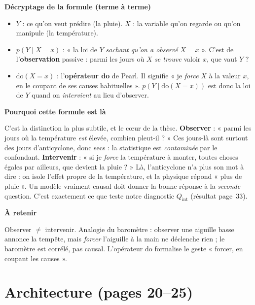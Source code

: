 \documentclass[11pt,a4paper]{article}
\newcommand{\bloc}[1]{\par\medskip\noindent\textcolor{accent}{\textbf{#1}}\par\nopagebreak\smallskip}
\begin{document}
\bloc{Décryptage de la formule (terme à terme)}
\begin{itemize}[nosep]
  \item $Y$ : ce qu'on veut prédire (la pluie). $X$ : la variable qu'on regarde ou qu'on manipule (la température).
  \item $p(Y \mid X=x)$ : « la loi de $Y$ \emph{sachant qu'on a observé} $X=x$ ». C'est de l'\textbf{observation} passive : parmi les jours où $X$ \emph{se trouve} valoir $x$, que vaut $Y$ ?
  \item $\mathrm{do}(X=x)$ : l'\textbf{opérateur do} de Pearl. Il signifie « je \emph{force} $X$ à la valeur $x$, en le coupant de ses causes habituelles ». $p(Y \mid \mathrm{do}(X=x))$ est donc la loi de $Y$ quand on \emph{intervient} au lieu d'observer.
\end{itemize}

\bloc{Pourquoi cette formule est là}
C'est la distinction la plus subtile, et le c\oe ur de la thèse. \textbf{Observer} : « parmi les jours où la température \emph{est} élevée, combien pleut-il ? » Ces jours-là sont surtout des jours d'anticyclone, donc secs : la statistique est \emph{contaminée} par le confondant. \textbf{Intervenir} : « si je \emph{force} la température à monter, toutes choses égales par ailleurs, que devient la pluie ? » Là, l'anticyclone n'a plus son mot à dire : on isole l'effet propre de la température, et la physique répond « plus de pluie ». Un modèle vraiment causal doit donner la bonne réponse à la \emph{seconde} question. C'est exactement ce que teste notre diagnostic $Q_{\mathrm{int}}$ (résultat page~33).

\bloc{À retenir}
Observer $\ne$ intervenir. Analogie du baromètre : observer une aiguille basse annonce la tempête, mais \emph{forcer} l'aiguille à la main ne déclenche rien ; le baromètre est corrélé, pas causal. L'opérateur $\mathrm{do}$ formalise le geste « forcer, en coupant les causes ».

\section{Architecture (pages 20--25)}
\end{document}
